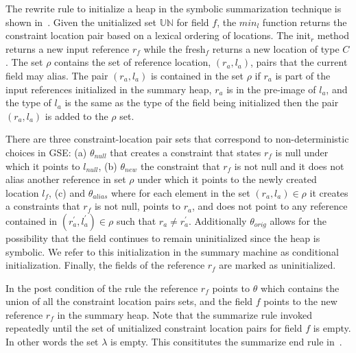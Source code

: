 
The rewrite rule to initialize a heap in the symbolic summarization
technique is shown in~. Given the unitialized set
$\mathbb{UN}$ for field $f$, the $\mathit{min}_l$ function returns the
constraint location pair based on a lexical ordering of locations. The
init$_r$ method returns a new input reference $r_f$ while the
fresh$_f$ returns a new location of type $C$. The set $\rho$ contains
the set of reference location, $(r_a, l_a)$, pairs that the current
field may alias. The pair $(r_a, l_a)$ is contained in the set $ \rho
$ if $r_a$ is part of the input references initialized in the summary
heap, $r_a$ is in the pre-image of $l_a$, and the type of $l_a$ is the
same as the type of the field being initialized then the pair $(r_a,
l_a)$ is added to the $\rho$ set.

There are three constraint-location pair sets that correspond to
non-deterministic choices in GSE: (a) $\theta_\mathit{null}$ that
creates a constraint that states $r_f$ is null under which it points
to $l_\mathit{null}$, (b) $\theta_\mathit{new}$ the constraint that
$r_f$ is not null and it does not alias another reference in set
$\rho$ under which it points to the newly created location $l_f$, (c)
and $\theta_\mathit{alias}$ where for each element in the set $(r_a,
l_a) \in \rho$ it creates a constraints that $r_f$ is not null, points
to $r_a$, and does not point to any reference contained in
$(r_a^\prime, l_a^\prime) \in \rho$ such that $r_a \neq
r_a^\prime$. Additionally $\theta_\mathit{orig}$ allows for the
possibility that the field continues to remain uninitialized since the
heap is symbolic. We refer to this initialization in the summary
machine as conditional initialization. Finally, the fields of the
reference $r_f$ are marked as uninitialized.

In the post condition of the rule the reference $r_f$ points to
$\theta$ which contains the union of all the constraint location pairs
sets, and the field $f$ points to the new reference $r_f$ in the
summary heap.  Note that the summarize rule invoked repeatedly until
the set of unitialized constraint location pairs for field $f$ is
empty. In other words the set $\lambda$ is empty. This consititutes
the summarize end rule in~.

